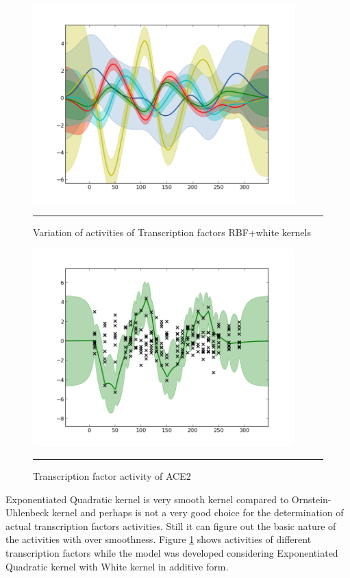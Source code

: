 \begin{figure}[]
	\centering
		\includegraphics[width=0.9\textwidth,keepaspectratio]{diagrams/RBFWh9TF.png}
		\rule{35em}{0.5pt}
	\caption[Variation of activities of Transcription factors with RBF+white kernels]
		{Variation of activities of Transcription factors RBF+white kernels}
	\label{fig:TFA_with_RBFnWhKernel}
\end{figure}

\begin{figure}[]
	\centering
		\includegraphics[width=0.9\textwidth,keepaspectratio]{diagrams/ACE2_OU_Wh_9TF.png}
		\rule{35em}{0.5pt}
	\caption[Transcription factor activity of ACE2]
		{Transcription factor activity of ACE2}
	\label{fig:TFA_of_of_ACE2}
\end{figure}
Exponentiated Quadratic kernel is very smooth kernel compared to Ornstein-Uhlenbeck kernel and 
perhaps is not a very good choice for the determination of actual transcription factors activities.
Still it can figure out the basic nature of the activities with over smoothness.
Figure \ref{fig:TFA_with_RBFnWhKernel} shows activities of different transcription factors while
the model was developed considering Exponentiated Quadratic kernel with White kernel in additive form.

